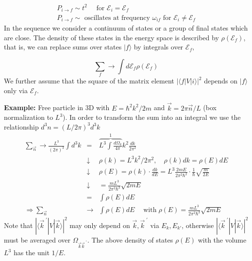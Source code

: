 \begin{equation}
\begin{array}{l}{P_{i \rightarrow f} \sim t^{2} \quad \text { for } \mathcal{E}_{i}=\mathcal{E}_{f}} \\ {P_{i \rightarrow f} \sim \text { oscillates at frequency } \omega_{i f} \text { for } \mathcal{E}_{i} \neq \mathcal{E}_{f}}\end{array}
\end{equation}
In the sequence we consider a continuum of states or a group of final states which are close. The density of these states in the energy space is described by $\rho(\mathcal{E}_f)$, that is, we can replace sums over states $| f\rangle$ by integrals over $\mathcal{E}_f$,

\begin{equation}
    \sum_{f} \rightarrow \int d \mathcal{E}_{f} \rho\left(\mathcal{E}_{f}\right)
    \end{equation}
We further assume that the square of the matrix element $| \langle f | V | i\rangle |^2$ depends on $| f\rangle$ only via $\mathcal{E}_f$.

\textbf{Example:} Free particle in 3D with $E = \hbar^2k^2 / 2m$ and $\vec{k} = 2\pi\vec{n}/ L$ (box normalization to $L^3$). In order to transform the sum into an integral we use the relationship $d^3n = (L / 2\pi)^3d^3k$
\begin{equation}
\begin{array} {rcl}
\sum_{\vec{n}} \rightarrow \frac{L^{3}}{(2 \pi)^{3}} \int d^{3} k&=& \overbrace{L^{3} \int \frac{d \Omega_{k}}{4 \pi}}^{1} k^{2} \frac{d k}{2 \pi^{2}} \\ 
& \downarrow& \rho(k)=L^{3} k^{2} / 2 \pi^{2}, \quad \rho(k) d k=\rho(E) d E \\
& \downarrow &\rho(E)=\rho(k) \cdot \frac{d k}{d E}=L^{3} \frac{2 m E}{2 \pi^{2} \hbar^{2}} \cdot \frac{1}{\hbar} \sqrt{\frac{m}{2 E}} \\ 
& \downarrow &= \frac{mL^3}{2\pi^2\hbar^3}\sqrt{2mE}\\
&=&\int \rho(E) d E \\ 
\Rightarrow \sum_{\vec{n}} &\rightarrow& \int \rho(E) d E \quad \operatorname{with} \rho(E)=\frac{m L^{3}}{2 \pi^{2} \hbar^{3}} \sqrt{2 m E} \end{array}
\end{equation}
Note that $|\langle\vec{k}^{\; \prime}|V|\vec{k}\rangle|^2 $ may only depend on $\vec{k},\vec{k}^{\;\prime}$ via $E_k, E_{k'}$, otherwise $|\langle\vec{k}^{\; \prime}|V|\vec{k}\rangle|^2 $ must be averaged over $\Omega_{\vec{k}\vec{k}^{\;\prime}}$. The above density of states $\rho(E)$ with the volume $L^3$ has the unit $1 / E$. 

